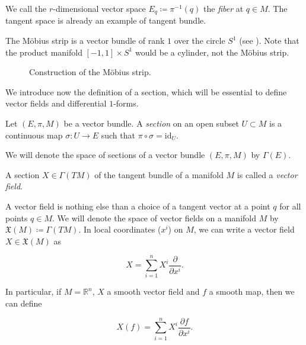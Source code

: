 We call the $r$-dimensional vector space $E_q \coloneqq \pi^{-1}(q)$ the \emph{fiber} at $q \in M$.
The tangent space is already an example of tangent bundle.

\begin{example}
    The Möbius strip is a vector bundle of rank $1$ over the circle $S^1$ (see ). Note that the product manifold $[-1, 1] \times S^1$ would be a cylinder, not the Möbius strip.
\end{example}

\begin{figure}
    \centering
    
    \caption{Construction of the Möbius strip.}
    \label{fig:Mobius}
\end{figure}

We introduce now the definition of a section, which will be essential to define vector fields and differential $1$-forms.

\begin{definition}
    Let $(E, \pi, M)$ be a vector bundle. A \emph{section} on an open subset $U \subset M$ is a continuous map $\sigma : U \rightarrow E$ such that $\pi \circ \sigma = \text{id}_U$.
\end{definition}

We will denote the space of sections of a vector bundle $(E, \pi, M)$ by $\Gamma(E)$.

\begin{definition}
    A section $X \in \Gamma(TM)$ of the tangent bundle of a manifold $M$ is called a \emph{vector field}.
\end{definition}

A vector field is nothing else than a choice of a tangent vector at a point $q$ for all points $q \in M$.
We will denote the space of vector fields on a manifold $M$ by $\mathfrak{X}(M) \coloneqq \Gamma(TM)$.
In local coordinates ($x^i$) on $M$, we can write a vector field $X \in \mathfrak{X}(M)$ as

\begin{equation*}
    X = \sum_{i=1}^n X^i \frac{\partial}{\partial x^i}.
\end{equation*}

In particular, if $M = \mathbb{R}^n$, $X$ a smooth vector field and $f$ a smooth map, then we can define

\begin{equation*}
    X(f) = \sum_{i=1}^n X^i \frac{\partial f}{\partial x^i} .
\end{equation*}

